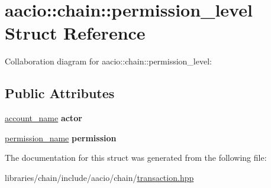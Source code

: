 \hypertarget{structaacio_1_1chain_1_1permission__level}{}\section{aacio\+:\+:chain\+:\+:permission\+\_\+level Struct Reference}
\label{structaacio_1_1chain_1_1permission__level}


Collaboration diagram for aacio\+:\+:chain\+:\+:permission\+\_\+level\+:
\subsection*{Public Attributes}
\begin{DoxyCompactItemize}
\item 
\mbox{\label{structaacio_1_1chain_1_1permission__level_afc2ccc229f35970197a2c86d7d3fafcd}} 
\mbox{\hyperlink{structaacio_1_1chain_1_1name}{account\+\_\+name}} {\bfseries actor}
\item 
\mbox{\label{structaacio_1_1chain_1_1permission__level_afeb8f73c2ac7763e34486d3942df868c}} 
\mbox{\hyperlink{structaacio_1_1chain_1_1name}{permission\+\_\+name}} {\bfseries permission}
\end{DoxyCompactItemize}


The documentation for this struct was generated from the following file\+:\begin{DoxyCompactItemize}
\item 
libraries/chain/include/aacio/chain/\mbox{\hyperlink{libraries_2chain_2include_2aacio_2chain_2transaction_8hpp}{transaction.\+hpp}}\end{DoxyCompactItemize}
